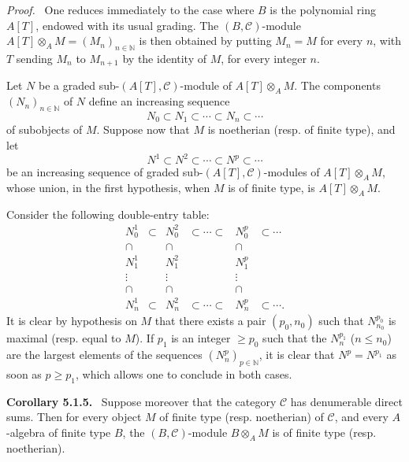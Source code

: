 \documentclass[11pt]{article}
\newenvironment{statement}[1]{\par\medskip\noindent\textbf{#1.}\ }{\par\medskip}
\newenvironment{prooftext}[1][Proof]{\par\noindent\emph{#1.}\ }{\par\medskip}
\begin{document}
\begin{prooftext}
One reduces immediately to the case where \(B\) is the polynomial ring \(A[T]\), endowed with its usual grading. The \((B,\mathcal C)\)-module \(A[T]\otimes_A M=(M_n)_{n\in\mathbb N}\) is then obtained by putting \(M_n=M\) for every \(n\), with \(T\) sending \(M_n\) to \(M_{n+1}\) by the identity of \(M\), for every integer \(n\).

Let \(N\) be a graded sub-\((A[T],\mathcal C)\)-module of \(A[T]\otimes_A M\). The components \((N_n)_{n\in\mathbb N}\) of \(N\) define an increasing sequence
\[
N_0\subset N_1\subset\cdots\subset N_n\subset\cdots
\]
of subobjects of \(M\). Suppose now that \(M\) is noetherian (resp. of finite type), and let
\[
N^1\subset N^2\subset\cdots\subset N^p\subset\cdots
\]
be an increasing sequence of graded sub-\((A[T],\mathcal C)\)-modules of \(A[T]\otimes_A M\), whose union, in the first hypothesis, when \(M\) is of finite type, is \(A[T]\otimes_A M\).

Consider the following double-entry table:
\[
\begin{array}{cccccc}
N_0^1&\subset&N_0^2&\subset\cdots\subset&N_0^p&\subset\cdots\\
\cap&&\cap&&\cap\\
N_1^1&&N_1^2&&N_1^p\\
\vdots&&\vdots&&\vdots\\
\cap&&\cap&&\cap\\
N_n^1&\subset&N_n^2&\subset\cdots\subset&N_n^p&\subset\cdots .
\end{array}
\]
It is clear by hypothesis on \(M\) that there exists a pair \((p_0,n_0)\) such that \(N^{p_0}_{n_0}\) is maximal (resp. equal to \(M\)). If \(p_1\) is an integer \(\ge p_0\) such that the \(N_n^{p_1}\) (\(n\le n_0\)) are the largest elements of the sequences \((N_n^p)_{p\in\mathbb N}\), it is clear that \(N^p=N^{p_1}\) as soon as \(p\ge p_1\), which allows one to conclude in both cases.
\end{prooftext}

\begin{statement}{Corollary 5.1.5}
Suppose moreover that the category \(\mathcal C\) has denumerable direct sums. Then for every object \(M\) of finite type (resp. noetherian) of \(\mathcal C\), and every \(A\)-algebra of finite type \(B\), the \((B,\mathcal C)\)-module \(B\otimes_A M\) is of finite type (resp. noetherian).
\end{statement}
\end{document}
